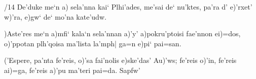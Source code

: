 \hsize 4in

/14
\GK
\obeylines
De'duke me`n a) sela'nna
kai` Plhi'ades, me'sai de`
nu'ktes, pa'ra d' e)'rxet' w)'ra,
e)gw` de` mo'na kate'udw.

\medskip

)Aste'res me`n a)mfi` kala`n sela'nnan
a)'y' a)pokru'ptoisi fae'nnon ei)=dos,
o)'ppotan plh'qoisa ma'lista la'mph|
ga=n e)pi` pai=san.

\medskip

('Espere, pa'nta fe'reis, o)'sa fai'nolis e)ske'das' Au)'ws;
fe'reis o)'in,
fe'reis ai)=ga,
fe'reis a)'pu ma'teri pai=da.
\hfill Sapfw'
\RM
\bye
